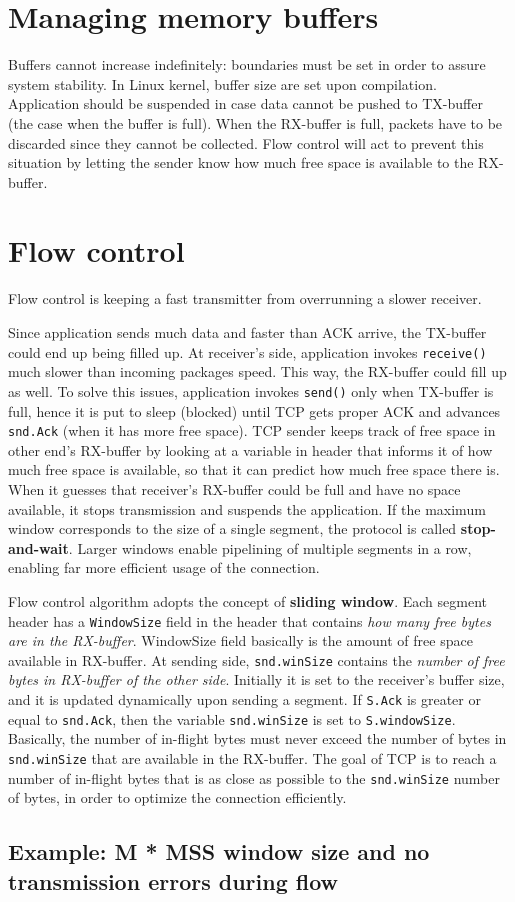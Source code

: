 \documentclass[a4paper, 11pt]{report}
\begin{document}
\section{Managing memory buffers}

Buffers cannot increase indefinitely: boundaries must be set in order to assure
system stability. In Linux kernel, buffer size are set upon compilation.
Application should be suspended in case data cannot be pushed to TX-buffer (the
case when the buffer is full). When the RX-buffer is full, packets have to be
discarded since they cannot be collected. Flow control will act to prevent this
situation by letting the sender know how much free space is available to the
RX-buffer.

\section{Flow control}

Flow control is keeping a fast transmitter from overrunning a slower receiver.

Since application sends much data and faster than ACK arrive, the TX-buffer
could end up being filled up. At receiver's side, application invokes
\texttt{receive()} much slower than incoming packages speed. This way, the
RX-buffer could fill up as well. To solve this issues, application invokes
\texttt{send()} only when TX-buffer is full, hence it is put to sleep (blocked)
until TCP gets proper ACK and advances \texttt{snd.Ack} (when it has more free
space). TCP sender keeps track of free space in other end's RX-buffer by
looking at a variable in header that informs it of how much free space is
available, so that it can predict how much free space there is. When it guesses
that receiver's RX-buffer could be full and have no space available, it stops
transmission and suspends the application. If the maximum window corresponds to
the size of a single segment, the protocol is called \textbf{stop-and-wait}.
Larger windows enable pipelining of multiple segments in a row, enabling far
more efficient usage of the connection.

Flow control algorithm adopts the concept of \textbf{sliding window}. Each
segment header has a \texttt{WindowSize} field in the header that contains
\emph{how many free bytes are in the RX-buffer}. WindowSize field basically is
the amount of free space available in RX-buffer. At sending side,
\texttt{snd.winSize} contains the \emph{number of free bytes in RX-buffer of
the other side}. Initially it is set to the receiver's buffer size, and it is
updated dynamically upon sending a segment. If \texttt{S.Ack} is greater or
equal to \texttt{snd.Ack}, then the variable \texttt{snd.winSize} is set to
\texttt{S.windowSize}. Basically, the number of in-flight bytes must never
exceed the number of bytes in \texttt{snd.winSize} that are available in the
RX-buffer. The goal of TCP is to reach a number of in-flight bytes that is as
close as possible to the \texttt{snd.winSize} number of bytes, in order to
optimize the connection efficiently.

\subsection{Example: M * MSS window size and no transmission errors during flow}
\end{document}
